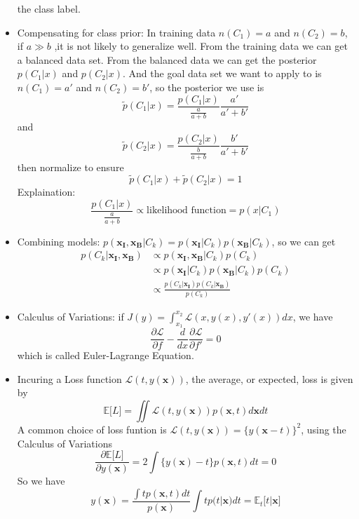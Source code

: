 \documentclass[UTF8]{article}
\begin{document}
\begin{itemize}
        the class label.
        \item Compensating for class prior: In training data $n(C_1)=a$ and $n(C_2)=b$, if 
        $a\gg b$ ,it is not likely to generalize well. From the training data we can get a 
        balanced data set. From the balanced data we can get the posterior $p(C_1|x)$ and 
        $p(C_2|x)$. And the goal data set we want to apply to is $n(C_1)=a'$ and $n(C_2)=b'$, 
        so the posterior we use is \[\widetilde{p}(C_1|x)=\frac{p(C_1|x)}{\frac{a}{a+b}}
        \frac{a'}{a'+b'}\] and \[\widetilde{p}(C_2|x)=\frac{p(C_2|x)}{\frac{b}{a+b}}
        \frac{b'}{a'+b'}\] then normalize to ensure
         \[\widetilde{p}(C_1|x)+\widetilde{p}(C_2|x)=1\]
         Explaination: 
         \[\frac{p(C_1|x)}{\frac{a}{a+b}}\propto \text{likelihood function}=p(x|C_1)\]
         \item Combining models: $p(\bm{x_I},\bm{x_B}|C_k)=p(\bm{x_I}|C_k)p(\bm{x_B}|C_k)$,
        so we can get
        \begin{align*}
            p(C_k|\bm{x_I},\bm{x_B})&\propto p(\bm{x_I},\bm{x_B}|C_k)p(C_k)\\
            &\propto p(\bm{x_I}|C_k)p(\bm{x_B}|C_k)p(C_k)\\
            &\propto \frac{p(C_k|\bm{x_I})p(C_k|\bm{x_B})}{p(C_k)}
        \end{align*}
        \item Calculus of Variations: if $J(y)=\int_{x_1}^{x_2}\mathcal{L}(x,y(x),y'(x))dx$, 
        we have 
        \[
            \frac{\partial\mathcal{L}}{\partial f}-\frac{d}{dx}
            \frac{\partial\mathcal{L}}{\partial f'}=0
            \]
        which is called Euler-Lagrange Equation.
        \item Incuring a Loss function $\mathcal{L}(t,y(\bm{x}))$, the average, or expected, 
        loss is given by
        \begin{equation}
            \label{equ:loss:expectation}
            \mathbb{E}\lbrack L\rbrack=\iint\mathcal{L}(t,y(\bm{x}))p(\bm{x},t)d\bm{x}dt
        \end{equation}
        A common choice of loss funtion is $\mathcal{L}(t,y(\bm{x}))=\{y(\bm{x}-t)\}^2$, 
        using the Calculus of Variations
        \[
            \frac{\partial\mathbb{E}\lbrack L\rbrack}{\partial y(\bm{x})}=
            2\int\{y(\bm{x})-t\}p(\bm{x},t)dt=0
            \]
        So we have
        \[
            y(\bm{x})=\frac{\int tp(\bm{x},t)dt}{p(\bm{x})}\int tp(t|\bm{x})dt=
            \mathbb{E}_t\lbrack t|\bm{x}\rbrack
            \]

\end{itemize}
\end{document}
